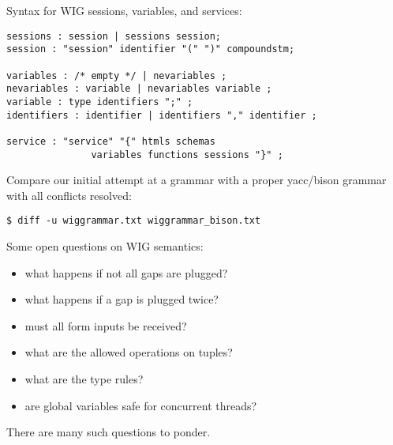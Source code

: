 \begin{slide*}
Syntax for WIG sessions, variables, and services:

\begin{scriptsize}
\begin{verbatim}
sessions : session | sessions session;
session : "session" identifier "(" ")" compoundstm;

variables : /* empty */ | nevariables ;
nevariables : variable | nevariables variable ;
variable : type identifiers ";" ;
identifiers : identifier | identifiers "," identifier ;

service : "service" "{" htmls schemas 
               variables functions sessions "}" ;
\end{verbatim}
\end{scriptsize}

\vspace{0.2in}

Compare our initial attempt at a grammar with a proper yacc/bison
grammar with all conflicts resolved:

\begin{scriptsize}
\begin{verbatim}
$ diff -u wiggrammar.txt wiggrammar_bison.txt
\end{verbatim}
\end{scriptsize}

\vfil
\end{slide*}
 
\begin{slide*}
Some open questions on WIG semantics:

\begin{itemize}
\item what happens if not all gaps are plugged?
\item what happens if a gap is plugged twice?
\item must all form inputs be received?
\item what are the allowed operations on tuples?
\item what are the type rules?
\item are global variables safe for concurrent threads?
\end{itemize}
\vspace*{2ex}

There are many such questions to ponder.
\vfil
\end{slide*}
 
